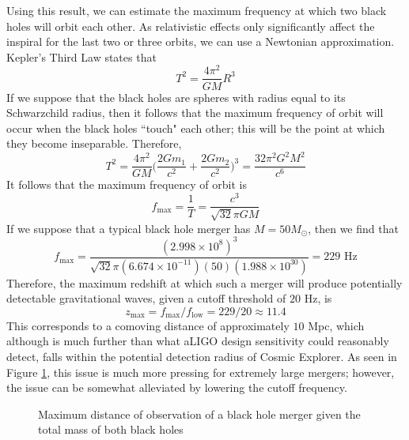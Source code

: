\documentclass{article}
\begin{document}
Using this result, we can estimate the maximum frequency at which two black holes will orbit each other. As relativistic effects only significantly affect the inspiral for the last two or three orbits, we can use a Newtonian approximation. Kepler's Third Law states that 
\begin{equation}
    T^2 = \frac{4\pi^2}{GM}R^3
\end{equation}
If we suppose that the black holes are spheres with radius equal to its Schwarzchild radius, then it follows that the maximum frequency of orbit will occur when the black holes ``touch" each other; this will be the point at which they become inseparable. Therefore, 
\begin{equation}
    T^2 = \frac{4\pi^2}{GM} \Big( \frac{2Gm_1}{c^2} + \frac{2Gm_2}{c^2} \Big)^3 = \frac{32\pi^2 G^2 M^2}{c^6}
\end{equation}
It follows that the maximum frequency of orbit is 
\begin{equation}
    f_{\text{max}} = \frac{1}{T} = \frac{c^3}{\sqrt{32} \pi GM}
\end{equation}
If we suppose that a typical black hole merger has $M = 50 M_\odot$, then we find that 
\begin{equation}
    f_\text{max} = \frac{(2.998\times 10^8)^3}{\sqrt{32} \pi (6.674 \times 10^{-11}) (50) (1.988 \times 10^{30})} = 229 \text{ Hz}
\end{equation}
Therefore, the maximum redshift at which such a merger will produce potentially detectable gravitational waves, given a cutoff threshold of $20$ Hz, is 
\begin{equation}
    z_\text{max} = f_\text{max} / f_\text{low} = 229 / 20 \approx 11.4
\end{equation}
This corresponds to a comoving distance of approximately $10$ Mpc, which although is much further than what aLIGO design sensitivity could reasonably detect, falls within the potential detection radius of Cosmic Explorer. As seen in Figure \ref{fig:maxdistance}, this issue is much more pressing for extremely large mergers; however, the issue can be somewhat alleviated by lowering the cutoff frequency. 

\begin{figure}[!htb]
    \caption{\label{fig:maxdistance} Maximum distance of observation of a black hole merger given the total mass of both black holes}
\end{figure}
\end{document}
